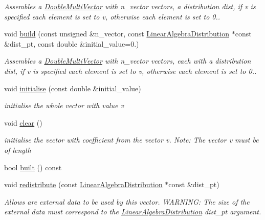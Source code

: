\begin{DoxyCompactItemize}
\begin{DoxyCompactList}\small\item\em Assembles a \hyperlink{classoomph_1_1DoubleMultiVector}{Double\+Multi\+Vector} with n\+\_\+vector vectors, a distribution dist, if v is specified each element is set to v, otherwise each element is set to 0.. \end{DoxyCompactList}\item 
void \hyperlink{classoomph_1_1DoubleMultiVector_a38714b8e2c119a373b34eb8b616a1c09}{build} (const unsigned \&n\+\_\+vector, const \hyperlink{classoomph_1_1LinearAlgebraDistribution}{Linear\+Algebra\+Distribution} $\ast$const \&dist\+\_\+pt, const double \&initial\+\_\+value=0.)
\begin{DoxyCompactList}\small\item\em Assembles a \hyperlink{classoomph_1_1DoubleMultiVector}{Double\+Multi\+Vector} with n\+\_\+vector vectors, each with a distribution dist, if v is specified each element is set to v, otherwise each element is set to 0.. \end{DoxyCompactList}\item 
void \hyperlink{classoomph_1_1DoubleMultiVector_a69f75b786cd1b2b45922075f1fa39de7}{initialise} (const double \&initial\+\_\+value)
\begin{DoxyCompactList}\small\item\em initialise the whole vector with value v \end{DoxyCompactList}\item 
void \hyperlink{classoomph_1_1DoubleMultiVector_a6e4ab708964cd1dce2d47ea2c0fc91df}{clear} ()
\begin{DoxyCompactList}\small\item\em initialise the vector with coefficient from the vector v. Note\+: The vector v must be of length \end{DoxyCompactList}\item 
bool \hyperlink{classoomph_1_1DoubleMultiVector_ad7ba248dc49b6bda0b49c28c677a82e7}{built} () const
\item 
void \hyperlink{classoomph_1_1DoubleMultiVector_a1a7f714e738c77e1938304c5911e09bf}{redistribute} (const \hyperlink{classoomph_1_1LinearAlgebraDistribution}{Linear\+Algebra\+Distribution} $\ast$const \&dist\+\_\+pt)
\begin{DoxyCompactList}\small\item\em Allows are external data to be used by this vector. W\+A\+R\+N\+I\+NG\+: The size of the external data must correspond to the \hyperlink{classoomph_1_1LinearAlgebraDistribution}{Linear\+Algebra\+Distribution} dist\+\_\+pt argument. \end{DoxyCompactList}\item 

\end{DoxyCompactItemize}
